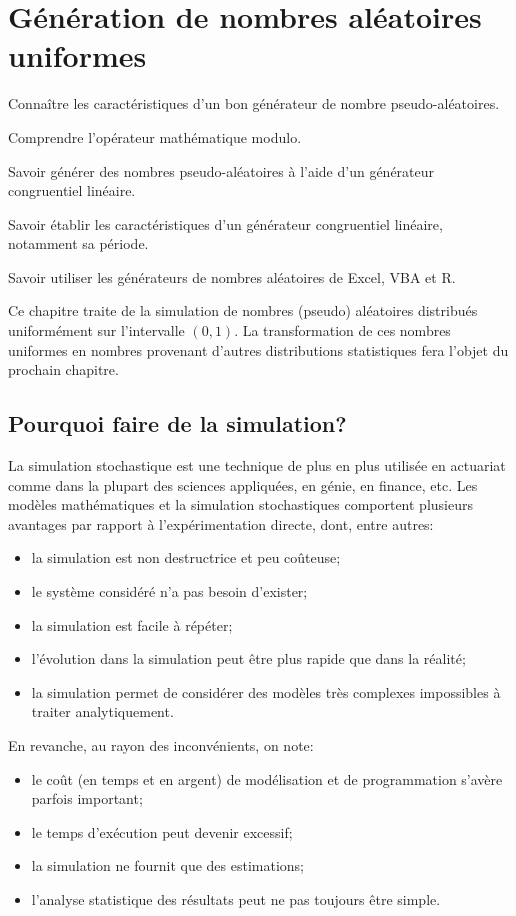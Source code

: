 \chapter{Génération de nombres aléatoires uniformes}
\label{chap:generation}

\begin{objectifs}
\item Connaître les caractéristiques d’un bon générateur de nombre
  pseudo-aléatoires.
\item Comprendre l’opérateur mathématique modulo.
\item Savoir générer des nombres pseudo-aléatoires à l’aide d’un
  générateur congruentiel linéaire.
\item Savoir établir les caractéristiques d’un générateur congruentiel
  linéaire, notamment sa période.
\item Savoir utiliser les générateurs de nombres aléatoires de Excel,
  VBA et R.
\end{objectifs}

Ce chapitre traite de la simulation de nombres (pseudo) aléatoires
distribués uniformément sur l'intervalle $(0, 1)$. La transformation
de ces nombres uniformes en nombres provenant d'autres distributions
statistiques fera l'objet du prochain chapitre.


\section{Pourquoi faire de la simulation?}
\label{sec:generation:pourquoi}

La simulation stochastique est une technique de plus en plus utilisée
en actuariat comme dans la plupart des sciences appliquées, en génie,
en finance, etc. Les modèles mathématiques et la simulation
stochastiques comportent plusieurs avantages par rapport à
l'expérimentation directe, dont, entre autres:
\begin{itemize}
\item la simulation est non destructrice et peu coûteuse;
\item le système considéré n'a pas besoin d'exister;
\item la simulation est facile à répéter;
\item l'évolution dans la simulation peut être plus rapide que dans la
  réalité;
\item la simulation permet de considérer des modèles très complexes
  impossibles à traiter analytiquement.
\end{itemize}
En revanche, au rayon des inconvénients, on note:
\begin{itemize}
\item le coût (en temps et en argent) de modélisation et de
  programmation s'avère parfois important;
\item le temps d'exécution peut devenir excessif;
\item la simulation ne fournit que des estimations;
\item l'analyse statistique des résultats peut ne pas toujours être
  simple.
\end{itemize}


